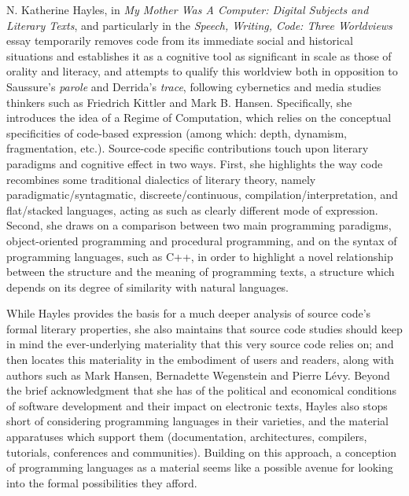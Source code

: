 N. Katherine Hayles, in \emph{My Mother Was A Computer: Digital Subjects and Literary Texts}\cite{hayles_my_2010}, and particularly in the \emph{Speech, Writing, Code: Three Worldviews} essay temporarily removes code from its immediate social and historical situations and establishes it as a cognitive tool as significant in scale as those of orality and literacy\cite{ong_orality_2012}, and attempts to qualify this worldview both in opposition to Saussure's \emph{parole} and Derrida's \emph{trace}, following cybernetics and media studies thinkers such as Friedrich Kittler and Mark B. Hansen. Specifically, she introduces the idea of a Regime of Computation, which relies on the conceptual specificities of code-based expression (among which: depth, dynamism, fragmentation, etc.). Source-code specific contributions touch upon literary paradigms and cognitive effect in two ways. First, she highlights the way code recombines some traditional dialectics of literary theory, namely paradigmatic/syntagmatic, discreete/continuous, compilation/interpretation, and flat/stacked languages, acting as such as clearly different mode of expression. Second, she draws on a comparison between two main programming paradigms, object-oriented programming and procedural programming, and on the syntax of programming languages, such as C++, in order to highlight a novel relationship between the structure and the meaning of programming texts, a structure which depends on its degree of similarity with natural languages.

While Hayles provides the basis for a much deeper analysis of source code's formal literary properties, she also maintains that source code studies should keep in mind the ever-underlying materiality that this very source code relies on; and then locates this materiality in the embodiment of users and readers, along with authors such as Mark Hansen\cite{hansen_bodies_2006}, Bernadette Wegenstein\cite{wegenstein_bodies_2010} and Pierre Lévy\cite{levy_programmation_1992}. Beyond the brief acknowledgment that she has of the political and economical conditions of software development and their impact on electronic texts, Hayles also stops short of considering programming languages in their varieties, and the material apparatuses which support them (documentation, architectures, compilers, tutorials, conferences and communities). Building on this approach, a conception of programming languages as a material seems like a possible avenue for looking into the formal possibilities they afford.

